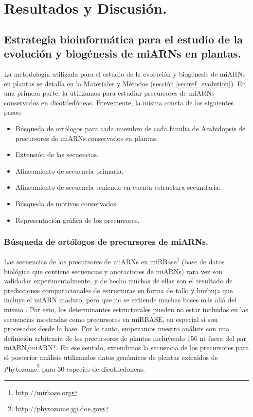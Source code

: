 \section{Resultados y Discusión.}

\subsection{Estrategia bioinformática para el estudio de la evolución y biogénesis de miARNs en plantas.}

La metodología utilizada para el estudio de la evolución y biogénesis de miARNs en plantas se detalla en la Materiales y Métodos (sección \ref{sec:ref_evolution}).
En una primera parte, la utilizamos para estudiar precursores de miARNs conservados en dicotiledóneas. 
Brevemente, la misma consta de los siguientes pasos:

\begin{itemize}
    \item Búsqueda de ortólogos para cada miembro de cada familia de Arabidopsis de  precursores de miARNs conservados en plantas.
    \item Extensión de las secuencias.
    \item Alineamiento de secuencia primaria.
    \item Alineamiento de secuencia teniendo en cuenta estructura secundaria.
    \item Búsqueda de motivos conservados.
    \item Representación gráfica de los precursores.
\end{itemize}

\subsubsection{Búsqueda de ortólogos de precursores de miARNs.}

Las secuencias de los precursores de miARNs en miRBase\footnote{http://mirbase.org} (base de datos biológica que contiene secuencias y anotaciones de miARNs) rara vez son validadas experimentalmente, y de hecho muchas de ellas son el resultado de predicciones computacionales de estructuras en forma de tallo y burbuja que incluye el miARN maduro, pero que no se extiende muchas bases más allá del mismo \cite{Kozomara2014}.
Por esto, los determinantes estructurales pueden no estar incluidos en las secuencias mostradas como precursores en miRBASE, en especial si son procesados desde la base.
Por lo tanto, empezamos nuestro análisis con una definición arbitraria de los precursores de plantas incluyendo 150 nt fuera del par miARN/miARN*.
En ese sentido, extendimos la secuencia de los precursores para el posterior análisis utilizandos datos genómicos de plantas extraídos de Phytozome\footnote{http://phytozome.jgi.doe.gov} para 30 especies de dicotiledoneas.

